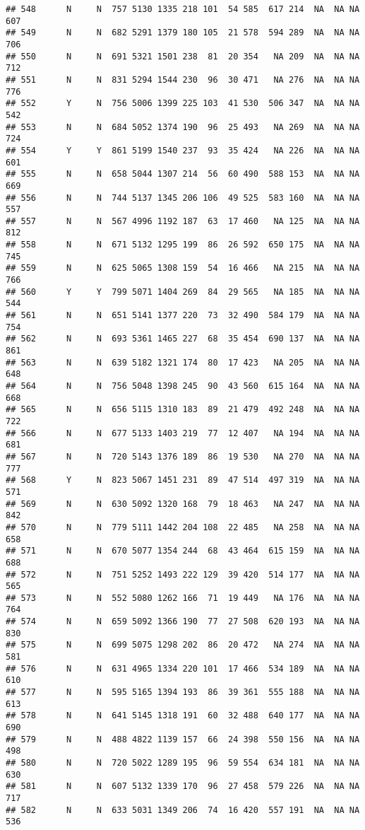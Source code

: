 \documentclass[]{article}
\begin{document}
\begin{verbatim}
## 548      N     N  757 5130 1335 218 101  54 585  617 214  NA  NA NA  607
## 549      N     N  682 5291 1379 180 105  21 578  594 289  NA  NA NA  706
## 550      N     N  691 5321 1501 238  81  20 354   NA 209  NA  NA NA  712
## 551      N     N  831 5294 1544 230  96  30 471   NA 276  NA  NA NA  776
## 552      Y     N  756 5006 1399 225 103  41 530  506 347  NA  NA NA  542
## 553      N     N  684 5052 1374 190  96  25 493   NA 269  NA  NA NA  724
## 554      Y     Y  861 5199 1540 237  93  35 424   NA 226  NA  NA NA  601
## 555      N     N  658 5044 1307 214  56  60 490  588 153  NA  NA NA  669
## 556      N     N  744 5137 1345 206 106  49 525  583 160  NA  NA NA  557
## 557      N     N  567 4996 1192 187  63  17 460   NA 125  NA  NA NA  812
## 558      N     N  671 5132 1295 199  86  26 592  650 175  NA  NA NA  745
## 559      N     N  625 5065 1308 159  54  16 466   NA 215  NA  NA NA  766
## 560      Y     Y  799 5071 1404 269  84  29 565   NA 185  NA  NA NA  544
## 561      N     N  651 5141 1377 220  73  32 490  584 179  NA  NA NA  754
## 562      N     N  693 5361 1465 227  68  35 454  690 137  NA  NA NA  861
## 563      N     N  639 5182 1321 174  80  17 423   NA 205  NA  NA NA  648
## 564      N     N  756 5048 1398 245  90  43 560  615 164  NA  NA NA  668
## 565      N     N  656 5115 1310 183  89  21 479  492 248  NA  NA NA  722
## 566      N     N  677 5133 1403 219  77  12 407   NA 194  NA  NA NA  681
## 567      N     N  720 5143 1376 189  86  19 530   NA 270  NA  NA NA  777
## 568      Y     N  823 5067 1451 231  89  47 514  497 319  NA  NA NA  571
## 569      N     N  630 5092 1320 168  79  18 463   NA 247  NA  NA NA  842
## 570      N     N  779 5111 1442 204 108  22 485   NA 258  NA  NA NA  658
## 571      N     N  670 5077 1354 244  68  43 464  615 159  NA  NA NA  688
## 572      N     N  751 5252 1493 222 129  39 420  514 177  NA  NA NA  565
## 573      N     N  552 5080 1262 166  71  19 449   NA 176  NA  NA NA  764
## 574      N     N  659 5092 1366 190  77  27 508  620 193  NA  NA NA  830
## 575      N     N  699 5075 1298 202  86  20 472   NA 274  NA  NA NA  581
## 576      N     N  631 4965 1334 220 101  17 466  534 189  NA  NA NA  610
## 577      N     N  595 5165 1394 193  86  39 361  555 188  NA  NA NA  613
## 578      N     N  641 5145 1318 191  60  32 488  640 177  NA  NA NA  690
## 579      N     N  488 4822 1139 157  66  24 398  550 156  NA  NA NA  498
## 580      N     N  720 5022 1289 195  96  59 554  634 181  NA  NA NA  630
## 581      N     N  607 5132 1339 170  96  27 458  579 226  NA  NA NA  717
## 582      N     N  633 5031 1349 206  74  16 420  557 191  NA  NA NA  536

\end{verbatim}
\end{document}
